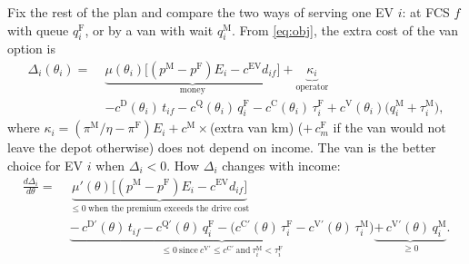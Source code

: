 \documentclass[12pt,a4paper]{article}
\begin{document}
Fix the rest of the plan and compare the two ways of serving one EV $i$: at FCS $f$ with queue $q^{\mathrm F}_i$, or by a van with wait $q^{\mathrm M}_i$. From \eqref{eq:obj}, the extra cost of the van option is
\begin{align*}
\Delta_i(\theta_i)=\;&\underbrace{\mu(\theta_i)\big[(p^{\mathrm M}-p^{\mathrm F})E_i-c^{\mathrm{EV}}d_{if}\big]}_{\text{money}}
+\underbrace{\kappa_i}_{\text{operator}}\\
&-c^{\mathrm D}(\theta_i)\,t_{if}-c^{\mathrm Q}(\theta_i)\,q^{\mathrm F}_i-c^{\mathrm C}(\theta_i)\,\tau^{\mathrm F}_i+c^{\mathrm V}(\theta_i)\big(q^{\mathrm M}_i+\tau^{\mathrm M}_i\big),
\end{align*}
where $\kappa_i=(\pi^{\mathrm M}/\eta-\pi^{\mathrm F})E_i+c^{\mathrm M}\times$(extra van km) ($+\,c^{\mathrm F}_m$ if the van would not leave the depot otherwise) does not depend on income. The van is the better choice for EV $i$ when $\Delta_i<0$. How $\Delta_i$ changes with income:
\begin{align*}
\frac{d\Delta_i}{d\theta}=\;&\underbrace{\mu'(\theta)\big[(p^{\mathrm M}-p^{\mathrm F})E_i-c^{\mathrm{EV}}d_{if}\big]}_{\le 0\ \text{when the premium exceeds the drive cost}}\\
&\underbrace{-\,c^{\mathrm D\prime}(\theta)\,t_{if}-c^{\mathrm Q\prime}(\theta)\,q^{\mathrm F}_i-\big(c^{\mathrm C\prime}(\theta)\,\tau^{\mathrm F}_i-c^{\mathrm V\prime}(\theta)\,\tau^{\mathrm M}_i\big)}_{\le 0\ \text{since}\ c^{\mathrm V\prime}\le c^{\mathrm C\prime}\ \text{and}\ \tau^{\mathrm M}_i<\tau^{\mathrm F}_i}
\underbrace{+\,c^{\mathrm V\prime}(\theta)\,q^{\mathrm M}_i}_{\ge 0}.
\end{align*}
\end{document}
